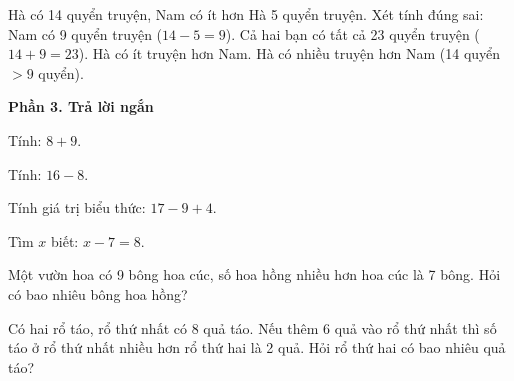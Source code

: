 \begin{ex} %
Hà có 14 quyển truyện, Nam có ít hơn Hà 5 quyển truyện. Xét tính đúng sai:
\choiceTF
{\True Nam có 9 quyển truyện ($14 - 5 = 9$).}
{\True Cả hai bạn có tất cả 23 quyển truyện ($14 + 9 = 23$).}
{Hà có ít truyện hơn Nam.}
{\True Hà có nhiều truyện hơn Nam (14 quyển $> 9$ quyển).}
\end{ex}

\textbf{Phần 3. Trả lời ngắn}

\begin{ex} %
Tính: $8 + 9$.
\end{ex}

\begin{ex} %
Tính: $16 - 8$.
\end{ex}

\begin{ex} %
Tính giá trị biểu thức: $17 - 9 + 4$.
\end{ex}

\begin{ex} %
Tìm $x$ biết: $x - 7 = 8$.
\end{ex}

\begin{ex} %
Một vườn hoa có 9 bông hoa cúc, số hoa hồng nhiều hơn hoa cúc là 7 bông. Hỏi có bao nhiêu bông hoa hồng?
\end{ex}

\begin{ex} %
Có hai rổ táo, rổ thứ nhất có 8 quả táo. Nếu thêm 6 quả vào rổ thứ nhất thì số táo ở rổ thứ nhất nhiều hơn rổ thứ hai là 2 quả. Hỏi rổ thứ hai có bao nhiêu quả táo?
\end{ex}
